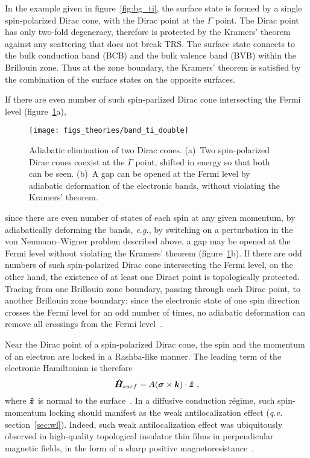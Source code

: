 In the example given in figure~\ref{fig:bg_ti}, the surface state is formed by a single spin-polarized Dirac cone, with the Dirac point at the $\Gamma$ point. The Dirac point has only two-fold degeneracy, therefore is protected by the Kramers' theorem against any scattering that does not break TRS. The surface state connects to the bulk conduction band (BCB) and the bulk valence band (BVB) within the Brillouin zone. Thus at the zone boundary, the Kramers' theorem is satisfied by the combination of the surface states on the opposite surfaces.

If there are even number of such spin-parlized Dirac cone intersecting the Fermi level (figure~\ref{fig:bg_ti_double}a),%
\begin{figure}[ht]%
    \centering%
    \texttt{[image: figs\_theories/band\_ti\_double]}%
    \caption[Adiabatic elimination of two Dirac cones]{\label{fig:bg_ti_double}Adiabatic elimination of two Dirac cones. (a)~Two spin-polarized Dirac cones coexist at the $\Gamma$ point, shifted in energy so that both can be seen. (b)~A gap can be opened at the Fermi level by adiabatic deformation of the electronic bands, without violating the Kramers' theorem.}%
\end{figure} %
%
since there are even number of states of each spin at any given momentum, by adiabatically deforming the bands, \textit{e.g.}, by switching on a perturbation in the von Neumann--Wigner problem described above, a gap may be opened at the Fermi level without violating the Kramers' theorem (figure~\ref{fig:bg_ti_double}b). If there are odd numbers of such spin-polarized Dirac cone intersecting the Fermi level, on the other hand, the existence of at least one Diract point is topologically protected. Tracing from one Brillouin zone boundary, passing through each Dirac point, to another Brillouin zone boundary: since the electronic state of one spin direction crosses the Fermi level for an odd number of times, no adiabatic deformation can remove all crossings from the Fermi level~\cite{Kane2005}.

Near the Dirac point of a spin-polarized Dirac cone, the spin and the momentum of an electron are locked in a Rashba-like manner. The leading term of the electronic Hamiltonian is therefore%
\begin{equation}%
    \op{H}_{surf} = A (\vec{\sigma} \times \vec{k}) \cdot \vu*{z}~,\label{eq:surf_Rashba}%
\end{equation}%
where $\vu*{z}$ is normal to the surface~\cite{TI_Qi, TI_electronic_structure_zhang, Liu2010}. In a diffusive conduction r\'egime, such spin-momentum locking should manifest as the weak antilocalization effect (\textit{q.v.} section~\ref{sec:wl}). Indeed, such weak antilocalization effect was ubiquitously observed in high-quality topological insulator thin films in perpendicular magnetic fields, in the form of a sharp positive magnetoresistance~\cite{TI_WAL_Hongkong, TI_WAL_thickness, zhangli2012}.

